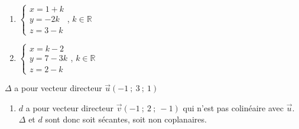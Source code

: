\begin{colonne*exercice}
\begin{exercice*}
\begin{enumerate}
  \item \begin{center}
      $\begin{cases}x=1+k \\y=-2k \\z=3-k \end{cases}$,
      $k\in\mathbb{R}$\\[3mm]
    \end{center}

  \item \begin{center}
      $\begin{cases}x=k-2 \\y=7-3k \\z=2-k \end{cases}$,
      $k\in\mathbb{R}$
    \end{center}
  \end{enumerate}
\end{exercice*}
\begin{corrige}
  $\Delta$ a pour vecteur directeur $\overrightarrow{u}(-1\ ;\ 3\ ;\ 1)$

\begin{enumerate}
\item  $d$ a pour vecteur directeur $\overrightarrow{v}(-1\ ;\ 2\ ;\
  -1)$ qui n'est pas colinéaire avec $\overrightarrow{u}$. $\Delta$ et
  $d$ sont donc soit sécantes, soit non coplanaires.


\end{enumerate}
\end{corrige}
\end{colonne*exercice}
